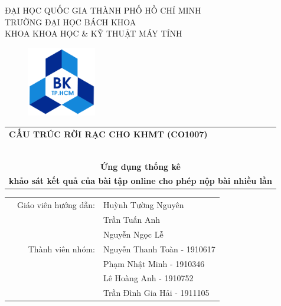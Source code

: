 \documentclass[a4paper]{article}
\theoremstyle{definition}
\begin{document}
\begin{titlepage}
\begin{center}
ĐẠI HỌC QUỐC GIA THÀNH PHỐ HỒ CHÍ MINH \\
TRƯỜNG ĐẠI HỌC BÁCH KHOA \\
KHOA KHOA HỌC \& KỸ THUẬT MÁY TÍNH 
\end{center}

\vspace{1cm}

\begin{figure}[h!]
\begin{center}
\includegraphics[width=3cm]{Doc/hcmut.png}
\end{center}
\end{figure}

\vspace{1cm}


\begin{center}
\begin{tabular}{c}
\multicolumn{1}{l}{\textbf{{\Large CẤU TRÚC RỜI RẠC CHO KHMT (CO1007)}}}\\
~~\\
\hline
\\
\textbf{\large Ứng dụng thống kê} \\
\textbf{\large khảo sát kết quả của bài tập online cho phép nộp bài nhiều lần}
\\
\hline
\end{tabular}
\end{center}

	\vspace{3cm}
	
	\begin{table}[h]
	\begin{tabular}{rrl}
	
	\hspace{4 cm} & Giáo viên hướng dẫn: & Huỳnh Tường Nguyên\\
	& & Trần Tuấn Anh \\
	& & Nguyễn Ngọc Lễ  \\
	& Thành viên nhóm: & Nguyễn Thanh Toàn - 1910617 \\
	& & Phạm Nhật Minh - 1910346 \\
	& & Lê Hoàng Anh - 1910752 \\
	& & Trần Đình Gia Hải - 1911105 \\
	

\end{tabular}
\end{table}
\end{titlepage}
\end{document}
